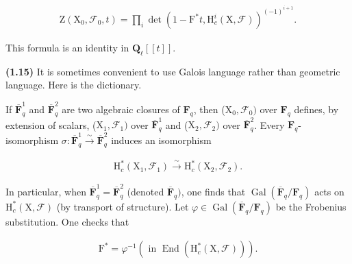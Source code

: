 \documentclass[10pt,leqno]{article}
\begin{document}
\begin{equation*}\begin{gathered}\mathrm{Z}(\mathrm{X}_{0},\mathcal{F} _{0},t) = \prod _{i} \operatorname{det}(1- \mathrm{F}^{*}t,\mathrm{H}_{c}^{i}(\mathrm{X},\mathcal{F} ))^{(- 1)^{i+1}}.\end{gathered}\tag{1.14.3}\end{equation*}

\noindent This formula is an identity in \(\mathbf{Q}_{\ell }[[t]]\).\par

\noindent \textbf{(1.15)} It is sometimes convenient to use Galois language rather than geometric language. Here is the dictionary.\par

\noindent If \(\overline{\mathbf{F}}_{q}^{1}\) and \(\overline{\mathbf{F}}_{q}^{2}\) are two algebraic closures of \(\mathbf{F}_{q}\), then (\(\mathrm{X}_{0},\mathcal{F} _{0})\) over \(\mathbf{F}_{q}\) defines, by extension of scalars, (\(\mathrm{X}_{1},\mathcal{F} _{1})\) over \(\overline{\mathbf{F}}_{q}^{1}\) and (\(\mathrm{X}_{2},\mathcal{F} _{2})\) over \(\overline{\mathbf{F}}_{q}^{2}\). Every \(\mathbf{F}_{q}\)-isomorphism \(\sigma :\overline{\mathbf{F}}_{q}^{1}\xrightarrow{\sim }\overline{\mathbf{F}}_{q}^{2}\) induces an isomorphism\par

\begin{equation*}\begin{gathered}\mathrm{H}_{c}^{*}(\mathrm{X}_{1},\mathcal{F} _{1}) \xrightarrow{\sim } \mathrm{H}_{c}^{*}(\mathrm{X}_{2},\mathcal{F} _{2}).\end{gathered}\end{equation*}

\noindent In particular, when \(\overline{\mathbf{F}}_{q}^{1}=\overline{\mathbf{F}}_{q}^{2}\) (denoted \(\overline{\mathbf{F}}_{q})\), one finds that \(\operatorname{Gal}(\overline{\mathbf{F}}_{q}/\mathbf{F}_{q})\) acts on \(\mathrm{H}_{c}^{*}(\mathrm{X},\mathcal{F} )\) (by transport of structure). Let \(\varphi \in \operatorname{Gal}(\overline{\mathbf{F}}_{q}/\mathbf{F}_{q})\) be the Frobenius substitution. One checks that\par

\begin{equation*}\begin{gathered}\mathrm{F}^{*} = \varphi ^{- 1}    (\text{ in }\operatorname{End}(\mathrm{H}_{c}^{*}(\mathrm{X},\mathcal{F} ))).\end{gathered}\end{equation*}
\end{document}
